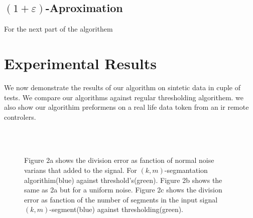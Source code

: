 \documentclass{vldb}
\begin{document}
\subsection{$(1+\varepsilon)$-Aproximation}
For the next part of the algorithem 



\section{Experimental Results} \label{Experimental Results}
We now demonstrate the results of our algorithm on sintetic data in cuple of tests. We compare our algorithms against regular thresholding algorithem. we also show our algorithim preformens on a real life data token from an ir remote controlers.

\begin{figure}[H]
\centering
{} \\
\\
\centering{}
\caption{Figure 2a shows the division error as fanction of normal noise varians that added to the signal. For $(k,m)$-segmantation algorithim(blue) against threshold's(green). Figure 2b shows the same as 2a but for a uniform noise. Figure 2c shows the division error as fanction of the number of segments in the input signal $(k,m)$-segment(blue) against  thresholding(green).  }
\label{noise}
\end{figure}
\end{document}
